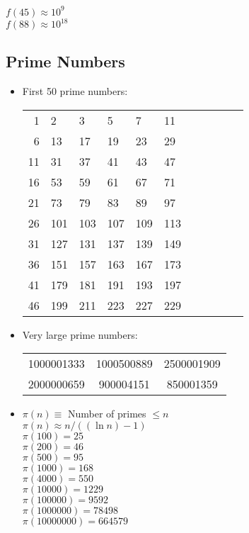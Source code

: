 \documentclass[twocolumn]{article}
\begin{document}
$f(45) \approx 10^9$\\
$f(88) \approx 10^{18}$


\subsection{Prime Numbers}

\begin{itemize}

\item First 50 prime numbers:\\
\begin{center}
    \begin{tabular}{r|llllllllll}
        1 & 2 & 3 & 5 & 7 & 11 \\
        6 & 13 & 17 & 19 & 23 & 29 \\
        11 & 31 & 37 & 41 & 43 & 47 \\
        16 & 53 & 59 & 61 & 67 & 71 \\
        21 & 73 & 79 & 83 & 89 & 97 \\
        26 & 101 & 103 & 107 & 109 & 113 \\
        31 & 127 & 131 & 137 & 139 & 149 \\
        36 & 151 & 157 & 163 & 167 & 173 \\
        41 & 179 & 181 & 191 & 193 & 197 \\
        46 & 199 & 211 & 223 & 227 & 229
    \end{tabular}
\end{center}

\item Very large prime numbers:\\
\begin{tabular}{ccc}
    1000001333 & 1000500889 & 2500001909 \\
    2000000659 & 900004151 & 850001359
\end{tabular}

\item $\pi(n) \equiv$ Number of primes $\leq n$ \\
$\pi(n) \approx n/((\ln n) - 1)$ \\
$\pi(100) = 25$ \\
$\pi(200) = 46$ \\
$\pi(500) = 95$ \\
$\pi(1000) = 168$ \\
$\pi(4000) = 550$ \\
$\pi(10000) = 1229$ \\
$\pi(100000) = 9592$ \\
$\pi(1000000) = 78498$ \\
$\pi(10000000) = 664579$ \\

\end{itemize}
\end{document}
